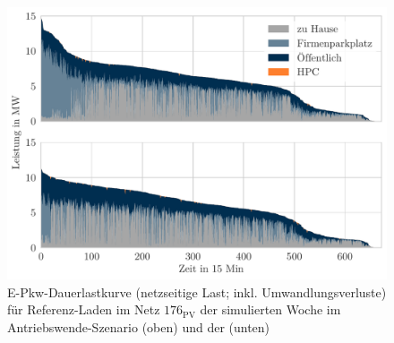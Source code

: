 \begin{figure}[H]
    \centering
    \includegraphics[width=\textwidth]{Bilder/example_load_duration_curve}
    \caption[E-Pkw-Dauerlastkurve für Referenz-Laden im Netz \num{176} der simulierten Woche im Antriebswende-Szenario und der Sensitivität Firmenparkplatz]{E-Pkw-Dauerlastkurve (netzseitige Last; inkl. Umwandlungsverluste) für Referenz-Laden im Netz \(176_{\text{PV}}\) der simulierten Woche im Antriebswende-Szenario (oben) und der \SzeFirmenparkplatz (unten)}\label{fig:example_load_curve}
\end{figure}